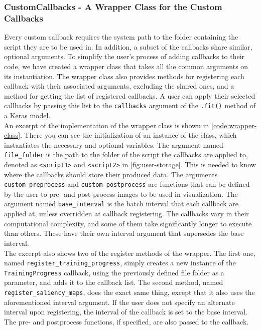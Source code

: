 \subsubsection{CustomCallbacks - A Wrapper Class for the Custom Callbacks}

Every custom callback requires the system path to the folder containing the script they are to be used in. In addition, a subset of the callbacks share similar, optional arguments. To simplify the user's process of adding callbacks to their code, we have created a wrapper class that takes all the common arguments on its instantiation. The wrapper class also provides methods for registering each callback with their associated arguments, excluding the shared ones, and a method for getting the list of registered callbacks. A user can apply their selected callbacks by passing this list to the \texttt{callbacks} argument of the \texttt{.fit()} method of a Keras model.\\

\noindent An excerpt of the implementation of the wrapper class is shown in \autoref{code:wrapper-class}. There you can see the initialization of an instance of the class, which instantiates the necessary and optional variables. The argument named \texttt{file\_folder} is the path to the folder of the script the callbacks are applied to, denoted as \texttt{<script1>} and \texttt{<script2>} in \autoref{fig:user-storage}. This is needed to know where the callbacks should store their produced data. The arguments \texttt{custom\_preprocess} and \texttt{custom\_postprocess} are functions that can be defined by the user to pre- and post-process images to be used in visualization. The argument named \texttt{base\_interval} is the batch interval that each callback are applied at, unless overridden at callback registering. The callbacks vary in their computational complexity, and some of them take significantly longer to execute than others. These have their own interval argument that supersedes the base interval. \\

\noindent The excerpt also shows two of the register methods of the wrapper. The first one, named \texttt{register\_training\_progress}, simply creates a new instance of the \texttt{TrainingProgress} callback, using the previously defined file folder as a parameter, and adds it to the callback list. The second method, named \texttt{register\_saliency\_maps}, does the exact same thing, except that it also uses the aforementioned interval argument. If the user does not specify an alternate interval upon registering, the interval of the callback is set to the base interval. The pre- and postprocess functions, if specified, are also passed to the callback.

